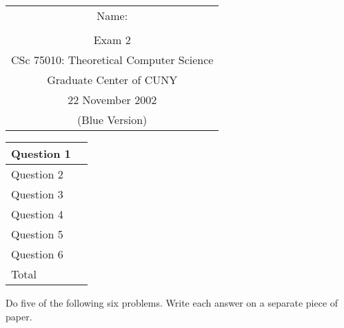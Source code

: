 \documentclass[11pt]{article}
\begin{document}
{\bf
\begin{tabular}{c}
	Name: \underline{\hspace{2.5in}}\\ \\
	{\large Exam 2}\\
        	CSc 75010: Theoretical Computer Science\\
        	Graduate Center of CUNY\\
	22 November 2002\\
        	(Blue Version)
\end{tabular}
}
\hfill
\begin{tabular}{|l|c|}
\hline
Question 1 & \mbox{\hspace{.5in}}\\
\hline        	
Question 2 & \\
\hline
Question 3 & \\
\hline
        	Question 4 & \\
\hline
        	Question 5 & \\
\hline
        	Question 6 & \\
\hline\hline
         Total & \\
\hline
\end{tabular}

Do five of the following six problems.  Write each answer on a separate
piece of paper.
\end{document}

